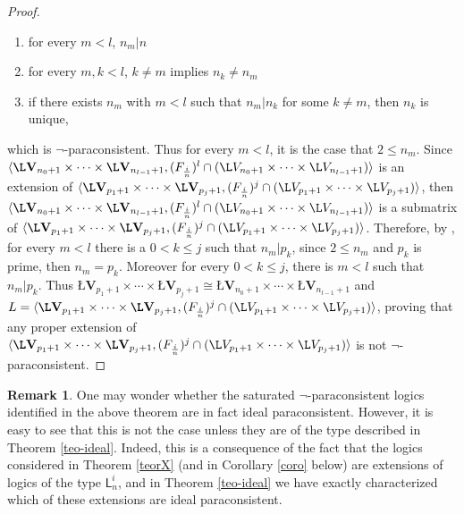 \documentclass{article}
\theoremstyle{definition}
\newtheorem{remark}{Remark}
\newcommand{\algLfin}{\textbf{\L}\mathbf{V}}
\newcommand{\domLfin}{{\L}V}
\begin{document}
\begin{proof}
\begin{enumerate}
 \item for every $m<l$, $n_{m}|n$
 \item for every $m, k<l$, $ k\neq m$ implies $ n_{k}\neq n_{m}$
 \item if there exists $n_{m}$ with $m<l$ such that $n_{m}|n_{k}$ for some
  $k\neq m$, then $n_{k}$ is unique,
\end{enumerate}
 which is $\neg$-paraconsistent. Thus for every $m<l$, it is the case that $2\leq n_{m}$. Since $\langle\algLfin_{n_{0}+1}\times\cdots\times\algLfin_{n_{l-1}+1}, (F_{\frac{i}{n}})^{l}\cap (\domLfin_{n_{0}+1}\times\cdots\times \domLfin_{n_{l-1}+1})\rangle$ is an extension of $\langle\algLfin_{p_{1}+1}\times\cdots\times\algLfin_{p_{j}+1}, (F_{\frac{i}{n}})^{j}\cap (\domLfin_{p_{1}+1}\times\cdots\times \domLfin_{p_{j}+1})\rangle$, then  $\langle \algLfin_{n_{0}+1}\times\cdots\times\algLfin_{n_{l-1}+1}, (F_{\frac{i}{n}})^{l}\cap (\domLfin_{n_{0}+1}\times\cdots\times \domLfin_{n_{l-1}+1})\rangle$ is a submatrix of $\langle \algLfin_{p_{1}+1}\times\cdots\times\algLfin_{p_{j}+1}, (F_{\frac{i}{n}})^{j}\cap (\domLfin_{p_{1}+1}\times\cdots\times \domLfin_{p_{j}+1})\rangle$. Therefore, by \cite[Lemma 5.6]{CoEsGiGo},
 for every $m<l$ there is a $0<k\leq j$ such that $n_{m}|p_{k}$, since $2\leq n_{m}$ and $p_{k}$ is prime, then $n_{m}=p_{k}$. Moreover for every $0<k\leq j$, there is $m<l$ such that $n_{m}|p_{k}$. Thus $\algLfin_{p_{1}+1}\times\cdots\times\algLfin_{p_{j}+1}\cong \algLfin_{n_{0}+1}\times\cdots\times\algLfin_{n_{l-1}+1}$ and $L= \langle \algLfin_{p_{1}+1}\times\cdots\times\algLfin_{p_{j}+1}, (F_{\frac{i}{n}})^{j}\cap (\domLfin_{p_{1}+1}\times\cdots\times \domLfin_{p_{j}+1})\rangle$, proving that any proper extension of $\langle \algLfin_{p_{1}+1}\times\cdots\times\algLfin_{p_{j}+1}, (F_{\frac{i}{n}})^{j}\cap (\domLfin_{p_{1}+1}\times\cdots\times \domLfin_{p_{j}+1})\rangle$ is not $\neg$-paraconsistent.
 \end{proof}



\begin{remark} \label{not-ideal}
One may wonder whether the saturated $\neg$-paraconsistent logics identified in the above theorem are in fact ideal paraconsistent. However, it is easy to see that this is not the case unless they are of the type described in Theorem \ref{teo-ideal}. Indeed, this is a consequence of the fact that the logics considered in Theorem \ref{teorX} (and in Corollary \ref{coro} below) are extensions of logics of the type $\mathsf{L}_{n}^{i}$, and in  Theorem \ref{teo-ideal} we have exactly characterized  which of these extensions are ideal paraconsistent.
\end{remark}
\end{document}
